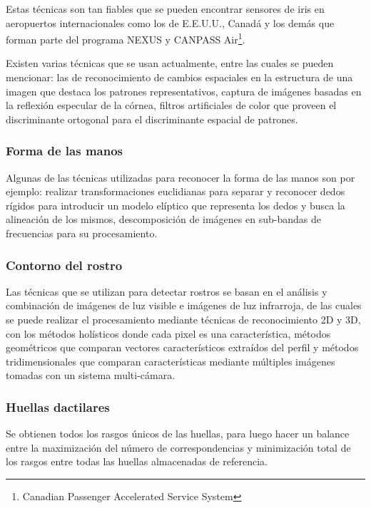 \documentclass[../principal]{subfiles}
\begin{document}
  Estas técnicas son tan fiables que se pueden encontrar sensores de iris en aeropuertos internacionales como los de E.E.U.U., Canadá y los demás que forman parte del programa NEXUS y CANPASS Air\footnote{Canadian Passenger Accelerated Service System}.

  Existen varias técnicas que se usan actualmente, entre las cuales se pueden mencionar: las de reconocimiento de cambios espaciales en la estructura de una imagen que destaca los patrones representativos, captura de imágenes basadas en la reflexión especular de la córnea, filtros artificiales de color que proveen el discriminante ortogonal para el discriminante espacial de patrones.\cite{web:reconocimiento_iris}

  \subsubsection{Forma de las manos}

  Algunas de las técnicas utilizadas para reconocer la forma de las manos son por ejemplo: realizar transformaciones euclidianas para separar y reconocer dedos rígidos para introducir un modelo elíptico que representa los dedos y busca la alineación de los mismos, descomposición de imágenes en sub-bandas de frecuencias para su procesamiento.\cite{tesis:verificacion_identidad_universidad_peru}

  \subsubsection{Contorno del rostro}

  Las técnicas que se utilizan para detectar rostros se basan en el análisis y combinación de imágenes de luz visible e imágenes de luz infrarroja, de las cuales se puede realizar el procesamiento mediante técnicas de reconocimiento 2D y 3D, con los métodos holísticos donde cada pixel es una característica, métodos geométricos que comparan vectores característicos extraídos del perfil y métodos tridimensionales que comparan características mediante múltiples imágenes tomadas con un sistema multi-cámara.\cite{web:reconocimiento_facial}

  \subsubsection{Huellas dactilares}

  Se obtienen todos los rasgos únicos de las huellas, para luego hacer un balance entre la maximización del número de correspondencias y minimización total de los rasgos entre todas las huellas almacenadas de referencia.\cite{tesis:verificacion_identidad_universidad_peru}
\end{document}
